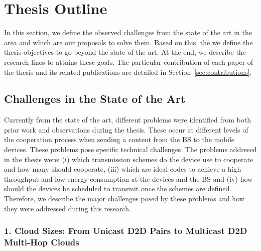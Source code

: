 \section{Thesis Outline}\label{sec:intro_thesis_outline}

In this section, we define the observed challenges from the state of the art in the area and which are our proposals to solve them. Based on this, the we define the thesis objectives to go beyond the state of the art. At the end, we describe the research lines to attains these goals. The particular contribution of each paper of the thesis and its related publications are detailed in Section~\ref{sec:contributions}.

\subsection{Challenges in the State of the Art}
Currently from the state of the art, different problems were identified from both prior work and observations during the thesis. These occur at different levels of the cooperation process when sending a content from the \ac{BS} to the mobile devices. These problems pose specific technical challenges. The problems addresed in the thesis were: (i) which transmission schemes do the device use to cooperate and how many should cooperate, (iii) which are ideal codes to achieve a high throughput and low energy consumption at the devices and the \ac{BS} and (iv) how should the devices be scheduled to transmit once the schemes are defined. Therefore, we describe the major challenges posed by these problems and how they were addressed during this research.

\subsubsection{1. Cloud Sizes: From Unicast D2D Pairs to Multicast D2D Multi-Hop Clouds}
\label{sec:cloud_sizes}

